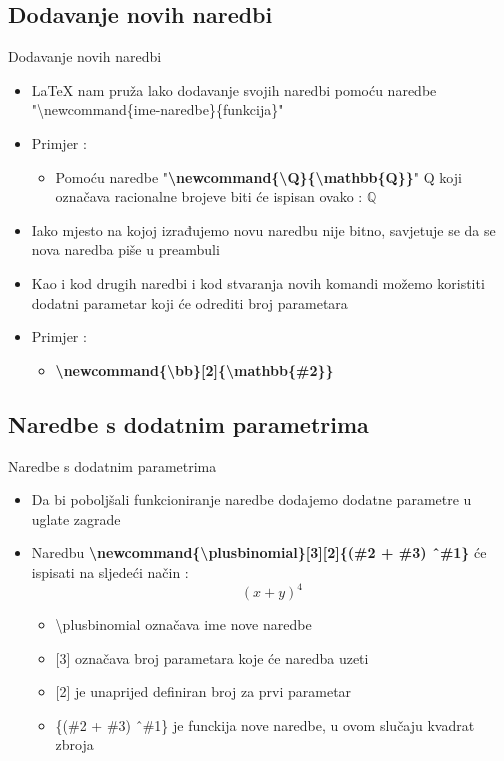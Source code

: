 \documentclass{beamer}
\newcommand{\plusbinomial}[3][2]{(#2 + #3) ^ #1}
\begin{document}
\subsection{Dodavanje novih naredbi}

\begin{frame}[t]{Dodavanje novih naredbi}
\begin{itemize}
	\item LaTeX nam pruža lako dodavanje svojih naredbi pomoću naredbe "\textbackslash newcommand\{ime-naredbe\}\{funkcija\}"
	\item Primjer :
	\begin{itemize}
		\newcommand{\Q}{\mathbb{Q}} 
		\item Pomoću naredbe "\textbf{\textbackslash newcommand\{\textbackslash Q\}\{\textbackslash mathbb\{Q\}\}}" Q koji označava racionalne brojeve biti će ispisan ovako : \( \Q \)
	\end{itemize}
	\item Iako mjesto na kojoj izrađujemo novu naredbu nije bitno, savjetuje se da se nova naredba piše u preambuli	 
	\item Kao i kod drugih naredbi i kod stvaranja novih komandi možemo koristiti dodatni parametar koji će odrediti broj parametara 
	\item Primjer :
		\begin{itemize}
			\item \textbf{\textbackslash newcommand\{\textbackslash bb\}{[}2{]}\{\textbackslash mathbb\{\#2\}\}}
		\end{itemize}	
\end{itemize}	
\end{frame}

\subsection{Naredbe s dodatnim parametrima}

\begin{frame}[t]{Naredbe s dodatnim parametrima}
\begin{itemize}
	\item Da bi poboljšali funkcioniranje naredbe dodajemo dodatne parametre u uglate zagrade
		\item Naredbu \textbf{\textbackslash newcommand\{\textbackslash plusbinomial\}{[}3{]}{[}2{]}\{(\#2 + \#3) \^\ \#1\}} će ispisati na sljedeći način :
				\[ \plusbinomial[4]{x}{y} \]
		\begin{itemize}
			\item \textbackslash plusbinomial označava ime nove naredbe		
			\item {[}3{]} označava broj parametara koje će naredba uzeti
			\item {[}2{]} je unaprijed definiran broj za prvi parametar
			\item  \{(\#2 + \#3) \^\ \#1\} je funckija nove naredbe, u ovom slučaju kvadrat zbroja
		\end{itemize}
\end{itemize}	
\end{frame}
\end{document}
